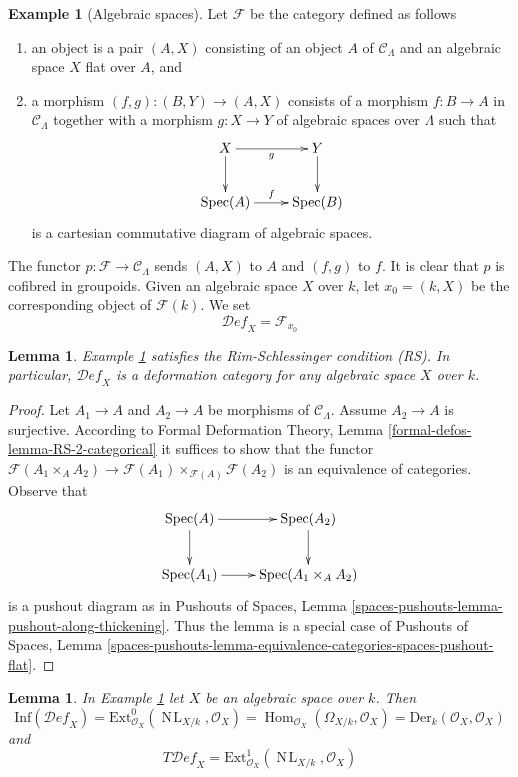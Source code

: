\documentclass{stacks-project}
\theoremstyle{plain}
\newtheorem{lemma}[subsection]{Lemma}
\theoremstyle{definition}
\newtheorem{example}[subsection]{Example}
\theoremstyle{remark}
\numberwithin{equation}{subsection}
\def\Spec{\mathop{\mathrm{Spec}}}
\def\Hom{\mathop{\mathrm{Hom}}\nolimits}
\def\NL{\mathop{N\!L}\nolimits}
\def\Deformationcategory{\mathcal{D}\!\mathit{ef}}
\begin{document}
\begin{example}[Algebraic spaces]
\label{example-spaces}
Let $\mathcal{F}$ be the category defined as follows
\begin{enumerate}
\item an object is a pair $(A, X)$ consisting of an
object $A$ of $\mathcal{C}_\Lambda$ and an algebraic space
$X$ flat over $A$, and
\item a morphism $(f, g) : (B, Y) \to (A, X)$ consists of
a morphism $f : B \to A$ in $\mathcal{C}_\Lambda$ together
with a morphism $g : X \to Y$ of algebraic spaces over $\Lambda$
such that
$$
\xymatrix{
X \ar[r]_g \ar[d] & Y \ar[d] \\
\Spec(A) \ar[r]^f & \Spec(B)
}
$$
is a cartesian commutative diagram of algebraic spaces.
\end{enumerate}
The functor $p : \mathcal{F} \to \mathcal{C}_\Lambda$ sends $(A, X)$
to $A$ and $(f, g)$ to $f$. It is clear that $p$ is cofibred in groupoids.
Given an algebraic space $X$ over $k$, let
$x_0 = (k, X)$ be the corresponding object of $\mathcal{F}(k)$. We set
$$
\Deformationcategory_X = \mathcal{F}_{x_0}
$$
\end{example}

\begin{lemma}
\label{lemma-spaces-RS}
Example \ref{example-spaces}
satisfies the Rim-Schlessinger condition (RS).
In particular, $\Deformationcategory_X$ is a deformation category
for any algebraic space $X$ over $k$.
\end{lemma}

\begin{proof}
Let $A_1 \to A$ and $A_2 \to A$ be morphisms of $\mathcal{C}_\Lambda$.
Assume $A_2 \to A$ is surjective. According to
Formal Deformation Theory, Lemma
\ref{formal-defos-lemma-RS-2-categorical}
it suffices to show that the functor
$\mathcal{F}(A_1 \times_A A_2) \to
\mathcal{F}(A_1) \times_{\mathcal{F}(A)} \mathcal{F}(A_2)$
is an equivalence of categories.
Observe that
$$
\xymatrix{
\Spec(A) \ar[r] \ar[d] & \Spec(A_2) \ar[d] \\
\Spec(A_1) \ar[r] &
\Spec(A_1 \times_A A_2)
}
$$
is a pushout diagram as in Pushouts of Spaces, Lemma
\ref{spaces-pushouts-lemma-pushout-along-thickening}.
Thus the lemma is a special case of Pushouts of Spaces, Lemma
\ref{spaces-pushouts-lemma-equivalence-categories-spaces-pushout-flat}.
\end{proof}

\begin{lemma}
\label{lemma-spaces-TI}
In Example \ref{example-spaces} let $X$ be an algebraic space over $k$. Then
$$
\text{Inf}(\Deformationcategory_X) =
\text{Ext}^0_{\mathcal{O}_X}(\NL_{X/k}, \mathcal{O}_X) =
\Hom_{\mathcal{O}_X}(\Omega_{X/k}, \mathcal{O}_X) =
\text{Der}_k(\mathcal{O}_X, \mathcal{O}_X)
$$
and
$$
T\Deformationcategory_X =
\text{Ext}^1_{\mathcal{O}_X}(\NL_{X/k}, \mathcal{O}_X)
$$
\end{lemma}
\end{document}
